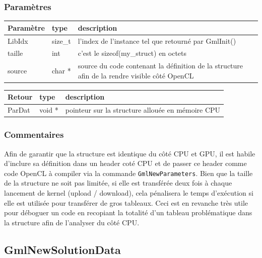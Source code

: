 \documentclass[a4paper,12pt]{article}
\begin{document}
\subsubsection*{Paramètres}

\begin{tabular}{|m{2cm}|m{1.5cm}|m{10.5cm}|}
\hline
Paramètre  & type    & description \\
\hline
LibIdx     & size\_t & l'index de l'instance tel que retourné par GmlInit() \\
\hline
taille     & int     & c'est le sizeof(my\_struct) en octets \\
\hline
source     & char *  & source du code contenant la définition de la structure afin de la rendre visible côté OpenCL \\
\hline
\end{tabular}

\medskip

\begin{tabular}{|m{2cm}|m{1.5cm}|m{10.5cm}|}
\hline
Retour     & type   & description \\
\hline
ParDat     & void * & pointeur sur la structure allouée en mémoire CPU \\
\hline
\end{tabular}

\subsubsection*{Commentaires}
Afin de garantir que la structure est identique du côté CPU et GPU, il est habile d'inclure sa définition dans un header coté CPU et de passer ce header comme code OpenCL à compiler via la commande {\tt GmlNewParameters}.
Bien que la taille de la structure ne soit pas limitée, si elle est transférée deux fois à chaque lancement de kernel (upload / download), cela pénalisera le temps d'exécution si elle est utilisée pour transférer de gros tableaux.
Ceci est en revanche très utile pour déboguer un code en recopiant la totalité d'un tableau problématique dans la structure afin de l'analyser du côté CPU.


\subsection{GmlNewSolutionData}
\end{document}

